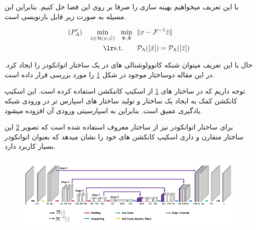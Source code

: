 با این تعریف میخواهیم بهینه سازی را صرفا بر روی این فضا حل کنیم. بنابراین این مسیله به صورت زیر قابل بازنویسی است.

\begin{subequations}\label{eq:P'A}
	\begin{align}
	(P'_A) \quad
	\min_{\hat{z}\in\mathbb{\mathcal{H}(\psi, \tilde{\psi})}} \ \
	\min_{\Psi, \tilde{\Psi}} \ \  & \| x - \F^{-1}{\hat{z}}\| \\
	\lrtext{s.t.} \qquad  & \Rho_\Lambda([\hat{x}]) = \Rho_\Lambda([\hat{z}])
	\end{align}
\end{subequations}


حال با این تعریف میتوان شبکه کانوولوشنالی های در یک ساختار اتوانکودر را ایجاد کرد.
در این مقاله دوساختار موجود در شکل 	\ref{fig:kspace2020-architectures}
را مورد بررسی قرار داده است.

\begin{figure}
	\centering
	\label{fig:kspace2020-architectures}
\end{figure}

توجه داریم که در ساختار های \ref{fig:kspace2020-architectures}
 از اسکیپ کاننکشن 
 استفاده کرده است. این اسکیپ کانکشن کمک به ایجاد یک ساختار  و تولید ساختار های اسپارس تر در ورودی شبکه یادگیری عمیق است. بنابراین به اسپارسیتی ورودی آن افزوده میشود.
 
 برای ساختار اتوانکودر نیز از ساختار معروف  استفاده شده است که تصویر 
 \ref{fig:unet}
 این ساختار متقارن و داری اسکیپ کانکشن های خود را نشان میدهد که بعنوان اتوانکودر بسیار کاربرد دارد.



\begin{figure}
	\centering
	\includegraphics[width=0.9\linewidth]{chapters/chapter-2/figs/deeplearning/unet}
	\caption{}
	\label{fig:unet}
\end{figure}









